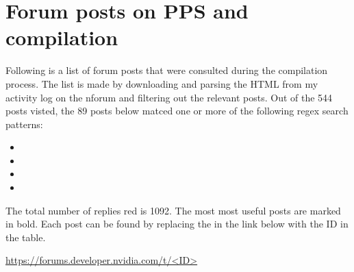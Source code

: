 \chapter{Forum posts on PPS and compilation}

Following is a list of forum posts that were consulted during the compilation process.
The list is made by downloading and parsing the HTML from my activity log on the \gls{nforum} \cite{martensPostsRedEmil} and filtering out the relevant posts.
Out of the 544 posts visted, the 89 posts below matced one or more of the following regex search patterns:
\begin{itemize}
    \item {}
    \item {}
    \item {}
    \item {}
\end{itemize}
The total number of replies red is 1092.
The most most useful posts are marked in bold.
Each post can be found by replacing the  in the link below with the ID in the table.

\url{https://forums.developer.nvidia.com/t/<ID>}

